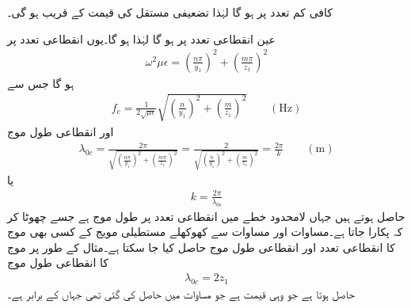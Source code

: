 کافی کم تعدد پر  ہو گا لہٰذا تضعیفی مستقل کی قیمت    کے قریب ہو گی۔

عین انقطاعی تعدد پر  ہو گا لہٰذا  ہو گا۔یوں انقطاعی تعدد پر
\begin{align}
\omega^2 \mu \epsilon =\left(\frac{n\pi}{y_1}\right)^2+\left(\frac{m\pi}{z_1}\right)^2
\end{align}
ہو گا جس سے 
\begin{align}\label{مساوات_مویج_مستطیلی-انقطاعی_تعدد}
f_c=\frac{1}{2 \sqrt{\mu \epsilon}} \sqrt{\left(\frac{n}{y_1}\right)^2+\left(\frac{m}{z_1}\right)^2} \quad \quad (\si{\hertz})
\end{align}
اور انقطاعی طول موج
\begin{align}\label{مساوات_مویج_مستطیلی-انقطاعی_طول_موج}
\lambda_{0c}=\frac{2\pi}{\sqrt{\left(\frac{n\pi}{y_1}\right)^2+\left(\frac{m\pi}{z_1}\right)^2}}=\frac{2}{\sqrt{\left(\frac{n}{y_1}\right)^2+\left(\frac{m}{z_1}\right)^2}}=\frac{2\pi}{k}  \quad \quad (\si{\meter})
\end{align}
یا
\begin{align}\label{مساوات_مویج_انقطاعی_تعدد_اور_کے}
k=\frac{2\pi}{\lambda_{0c}}
\end{align}
حاصل ہوتے ہیں جہاں  لامحدود خطے میں انقطاعی تعدد پر طول موج ہے جسے چھوٹا کر کہ  پکارا جاتا ہے۔مساوات  اور مساوات  سے کھوکھلے مستطیلی مویج کے کسی بھی  موج کا انقطاعی تعدد اور انقطاعی طول موج حاصل کیا جا سکتا ہے۔مثال کے
 طور پر  موج کا انقطاعی طول موج
\begin{align}
\lambda_{0c}=2 z_1
\end{align}
حاصل ہوتا ہے جو وہی قیمت ہے جو مساوات  میں حاصل کی گئی تھی جہاں  کے برابر ہے۔ 

